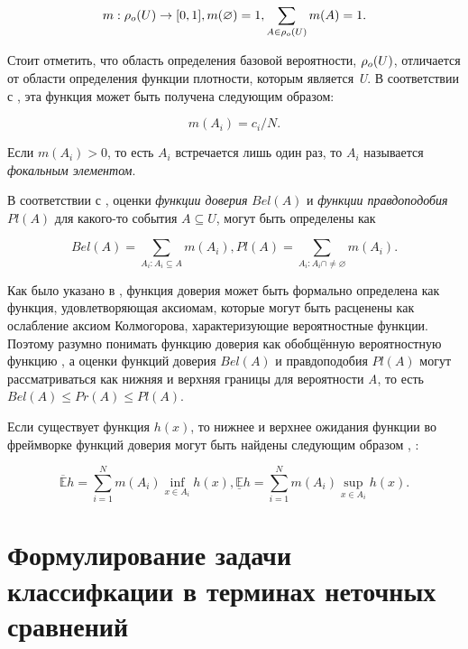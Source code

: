 \documentclass[12pt,a4paper,oneside]{article}
\begin{document}
\[
m : \mathrm{\rho}_o(U) \to [0,1],
m(\varnothing) = 1, \sum \limits_{A \in \mathrm{\rho}_o(U)} m(A) = 1.
\]

\par
Стоит отметить, что область определения базовой вероятности, \(\mathrm{\rho}_o(U)\), отличается от области определения функции плотности, которым является \emph{U}. 
В соответствии с , эта функция может быть получена следующим образом:

\[
m(A_i) = c_i / N.
\]

\par
Если \(m(A_i) > 0\), то есть \(A_i\) встречается лишь один раз, то \(A_i\) называется \emph{фокальным элементом}. 

\par
В соответствии с , оценки \emph{функции доверия} \(Bel(A)\) и \emph{функции правдоподобия} \(Pl(A)\) для какого-то события \(A \subseteq U\), могут быть определены как

\[
Bel(A) = \sum \limits_{A_i: A_i \subseteq A} m(A_i), 
Pl(A) = \sum \limits_{A_i: A_i \cap \neq \varnothing} m(A_i).
\]

Как было указано в , функция доверия может быть формально определена как функция, удовлетворяющая аксиомам, которые могут быть расценены как ослабление аксиом Колмогорова, характеризующие вероятностные функции. 
Поэтому разумно понимать функцию доверия как обобщённую вероятностную функцию , а оценки функций доверия \(Bel(A)\) и правдоподобия \(Pl(A)\) могут рассматриваться как нижняя и верхняя границы для вероятности \emph{A}, то есть \(Bel(A) \leq Pr(A) \leq Pl(A)\).

\par
Если существует функция \(h(x)\), то нижнее и верхнее ожидания функции во фреймворке функций доверия могут быть найдены следующим образом , :

\[
\mathbb{\overline{E}} h = \sum \limits_{i=1}^N m(A_i) \inf_{x \in A_i} h(x), 
\mathbb{\underline{E}} h = \sum \limits_{i=1}^N m(A_i) \sup_{x \in A_i} h(x).
\]


\section{Формулирование задачи классифкации в терминах неточных сравнений}
\label{sec:classification_problem_by_imprecise_comparisons}
\end{document}
